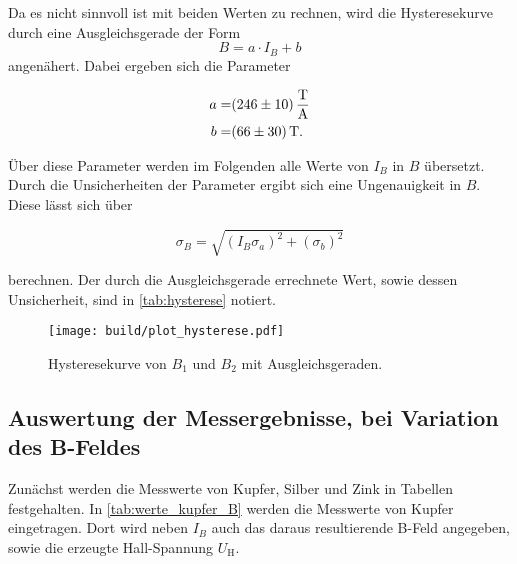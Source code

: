Da es nicht sinnvoll ist mit beiden Werten zu rechnen, wird die Hysteresekurve durch eine Ausgleichsgerade der Form
\begin{equation}
    B = a \cdot I_B + b
    \label{eq:gerade}
\end{equation}
angenähert.
Dabei ergeben sich die Parameter

\begin{align*}
    a =& \SI{246+-10}{\tesla\per\ampere} \\
    b =& \SI{66+-30}{\tesla}.
\end{align*}

Über diese Parameter werden im Folgenden alle Werte von $I_B$ in $B$ übersetzt.
Durch die Unsicherheiten der Parameter ergibt sich eine Ungenauigkeit in $B$.
Diese lässt sich über

\begin{equation}
    \sigma _B = \sqrt{\left(I_B \sigma _a \right)^2 + \left(\sigma _b \right)^2}
    \label{eq:B_fehler}
\end{equation}

berechnen.
Der durch die Ausgleichsgerade errechnete Wert, sowie dessen Unsicherheit, sind in \autoref{tab:hysterese} notiert.

\begin{figure}
    \centering
    \texttt{[image: build/plot\_hysterese.pdf]}
    \caption{Hysteresekurve von $B_1$ und $B_2$ mit Ausgleichsgeraden.\cite{numpy}}
    \label{fig:hysterese_plot}
\end{figure}

\subsection{Auswertung der Messergebnisse, bei Variation des B-Feldes}
\label{ssec:mess}

Zunächst werden die Messwerte von Kupfer, Silber und Zink in Tabellen festgehalten.
In \autoref{tab:werte_kupfer_B} werden die Messwerte von Kupfer eingetragen.
Dort wird neben $I_B$ auch das daraus resultierende B-Feld angegeben, sowie die erzeugte Hall-Spannung $U_\text{H}$.

